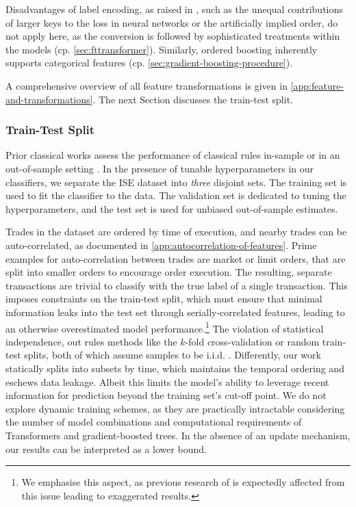 Disadvantages of label encoding, as raised in \textcite[][12]{hancockSurveyCategoricalData2020}, such as the unequal contributions of larger keys to the loss in neural networks or the artificially implied order, do not apply here, as the conversion is followed by sophisticated treatments within the models (cp. \cref{sec:fttransformer}). Similarly, ordered boosting inherently supports categorical features (cp. \cref{sec:gradient-boosting-procedure}).

A comprehensive overview of all feature transformations is given in \cref{app:feature-and-transformations}. The next Section discusses the train-test split.

\subsubsection{Train-Test Split}\label{sec:train-test-split}

Prior classical works assess the performance of classical rules in-sample \autocite[cp.][541]{ellisAccuracyTradeClassification2000} or in an out-of-sample setting \autocites[cp.][7--9]{grauerOptionTradeClassification2022}[][3814--3815]{chakrabartyTradeClassificationAlgorithms2007}. In the presence of tunable hyperparameters in our classifiers, we separate the \gls{ISE} dataset into \emph{three} disjoint sets. The training set is used to fit the classifier to the data. The validation set is dedicated to tuning the hyperparameters, and the test set is used for unbiased out-of-sample estimates.

Trades in the dataset are ordered by time of execution, and nearby trades can be auto-correlated, as documented in \cref{app:autocorrelation-of-features}.
Prime examples for auto-correlation between trades are market or limit orders, that are split into smaller orders to encourage order execution. %
The resulting, separate transactions are trivial to classify with the true label of a single transaction. This imposes constraints on the train-test split, which must ensure that minimal information leaks into the test set through serially-correlated features, leading to an otherwise overestimated model performance.\footnote{We emphasise this aspect, as previous research of \textcite[][14]{ronenMachineLearningTrade2022} is expectedly affected from this issue leading to exaggerated results.} The violation of statistical independence, out rules methods like the $k$-fold cross-validation or random train-test splits, both of which assume samples to be i.i.d. \autocite[][103--105]{lopezdepradoAdvancesFinancialMachine2018}. Differently, our work statically splits into subsets by time, which maintains the temporal ordering and eschews data leakage. Albeit this limits the model's ability to leverage recent information for prediction beyond the training set's cut-off point. We do not explore dynamic training schemes, as they are practically intractable considering the number of model combinations and computational requirements of Transformers and gradient-boosted trees. In the absence of an update mechanism, our results can be interpreted as a lower bound.

